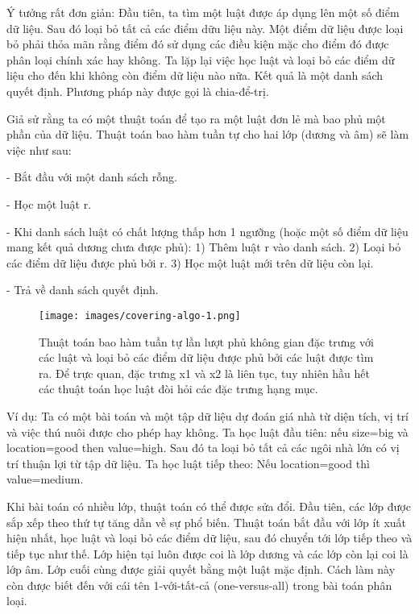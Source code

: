 Ý tưởng rất đơn giản: Đầu tiên, ta tìm một luật được áp dụng lên một số điểm dữ liệu. Sau đó loại bỏ tất cả các điểm dữu liệu này. Một điểm dữ liệu được loại bỏ phải thỏa mãn rằng điểm đó sử dụng các điều kiện mặc cho điểm đó được phân loại chính xác hay không. Ta lặp lại việc học luật và loại bỏ các điểm dữ liệu cho đến khi không còn điểm dữ liệu nào nữa. Kết quả là một danh sách quyết định. Phương pháp này được gọi là chia-để-trị.

Giả sử rằng ta có một thuật toán để tạo ra một luật đơn lẻ mà bao phủ một phần của dữ liệu. Thuật toán bao hàm tuần tự cho hai lớp (dương và âm) sẽ làm việc như sau:

- Bắt đầu với một danh sách rỗng.

- Học một luật r.

- Khi danh sách luật có chất lượng thấp hơn 1 ngưỡng (hoặc một số điểm dữ liệu mang kết quả dương chưa được phủ): 1) Thêm luật r vào danh sách. 2) Loại bỏ các điểm dữ liệu được phủ bởi r. 3) Học một luật mới trên dữ liệu còn lại.

- Trả về danh sách quyết định.

\begin{figure*}[h!]
	\centering
	\texttt{[image: images/covering-algo-1.png]}
	\label{fig:4_19}
	\caption{Thuật toán bao hàm tuần tự lần lượt phủ không gian đặc trưng với các luật và loại bỏ các điểm dữ liệu được phủ bởi các luật được tìm ra. Để trực quan, đặc trưng x1 và x2 là liên tục, tuy nhiên hầu hết các thuật toán học luật đòi hỏi các đặc trưng hạng mục.}
	
\end{figure*}

Ví dụ: Ta có một bài toán và một tập dữ liệu dự đoán giá nhà từ diện tích, vị trí và việc thú nuôi được cho phép hay không. Ta học luật đầu tiên: nếu size=big và location=good then value=high. Sau đó ta loại bỏ tất cả các ngôi nhà lớn có vị trí thuận lợi từ tập dữ liệu. Ta học luật tiếp theo: Nếu location=good thì value=medium. 

Khi bài toán có nhiều lớp, thuật toán có thể được sửa đổi. Đầu tiên, các lớp được sắp xếp theo thứ tự tăng dần về sự phổ biến. Thuật toán bắt đầu với lớp ít xuất hiện nhất, học luật và loại bỏ các điểm dữ liệu, sau đó chuyển tới lớp tiếp theo và tiếp tục như thế. Lớp hiện tại luôn được coi là lớp dương và các lớp còn lại coi là lớp âm. Lớp cuối cùng được giải quyết bằng một luật mặc định. Cách làm này còn được biết đến với cái tên 1-với-tất-cả (one-versus-all) trong bài toán phân loại.

